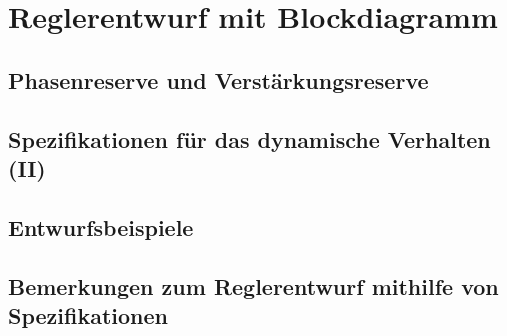 \section{Reglerentwurf mit Blockdiagramm}

\subsection{Phasenreserve und Verstärkungsreserve}

\subsection{Spezifikationen für das dynamische Verhalten (II)}

\subsection{Entwurfsbeispiele}

\subsection{Bemerkungen zum Reglerentwurf mithilfe von Spezifikationen}

